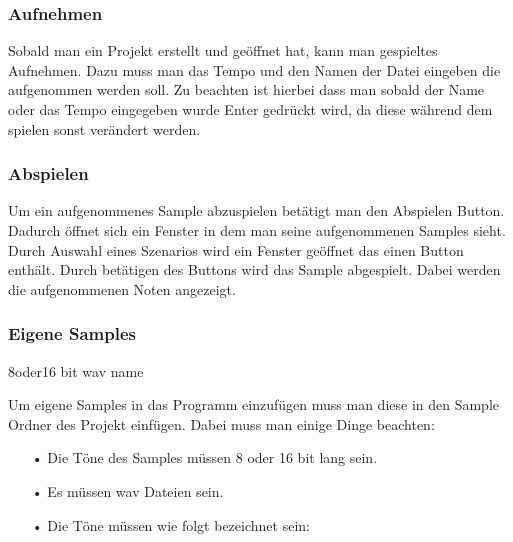 \subsubsection{Aufnehmen}

Sobald man ein Projekt erstellt und geöffnet hat, kann man gespieltes Aufnehmen. Dazu muss man das Tempo und den Namen der Datei eingeben die aufgenommen werden soll. Zu beachten ist hierbei dass man sobald der Name oder das Tempo eingegeben wurde Enter gedrückt wird, da diese während dem spielen sonst verändert werden.









\subsubsection{Abspielen}

Um ein aufgenommenes Sample abzuspielen betätigt man den Abspielen Button. Dadurch öffnet sich ein Fenster in dem man seine aufgenommenen Samples sieht. Durch Auswahl eines Szenarios wird ein Fenster geöffnet das einen Button enthält. Durch betätigen des Buttons wird das Sample abgespielt. Dabei werden die aufgenommenen Noten angezeigt. 



\subsubsection{Eigene Samples}
 8oder16 bit wav  name 
 
 Um eigene Samples in das Programm einzufügen muss man diese in den Sample Ordner des Projekt einfügen. Dabei muss man einige Dinge beachten:
 
 \begin{itemize}
   \item[•] Die Töne des Samples müssen 8 oder 16 bit lang sein.
   \item[•] Es müssen wav Dateien sein.
   \item[•] Die Töne müssen wie folgt bezeichnet sein:
   		\begin{itemize}
   		
   		\end{itemize}
   
 \end{itemize}            
             
             
             
             
             
             
             
             
             
             
             
             
             
             
             